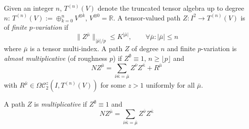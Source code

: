 \documentclass[a4paper,12pt,reqno]{amsproc}
\newcommand{\RR}{\mathbb{R}}
\newcommand{\NN}{N}
\newcommand{\OCC}{\Omega \mathcal{C}}
\begin{document}
Given an integer $n$, $T^{(n)}(V)$ denote the truncated tensor algebra
up to degree $n$:   $T^{(n)}(V) := \oplus_{k=0}^n V^{\otimes k}$,
$V^{\otimes 0 } = \RR$. A tensor-valued path $Z : I^2
\to T^{(n)}(V)$ is of \emph{finite $p$-variation} if 
\begin{equation}
  \label{eq:finite_p_variation_path}
 \|Z^{\bar{\mu}}\|_{|\bar{\mu}|/p} \le K^{|\bar\mu|}, \qquad \forall
 \bar{\mu} : | \bar{\mu}| \le n  
\end{equation}
where $\bar{\mu}$ is a tensor multi-index. A path $Z$ of degree $n$
and finite $p$-variation is \emph{almost multiplicative} (of roughness $p$) if
$Z^\emptyset \equiv 1$, $n \ge \lfloor p \rfloor$ and
\begin{equation}
  \label{eq:almost_multiplicative}
  \NN Z^{\bar\mu} =  
\sum_{\bar\nu\bar\kappa =  \bar\mu}
  Z^{\bar\nu} Z^{\bar\kappa} + R^{\bar\mu}
\end{equation}
with $R^{\bar\mu} \in \OCC_2^z(I,T^{(n)}(V))$ for some $z>1$ uniformly for all $\bar\mu$.

A path $Z$ is \emph{multiplicative} if
$Z^\emptyset \equiv 1$ and
\begin{equation}
  \label{eq:multiplicative}
  \NN Z^{\bar\mu} =  
\sum_{\bar\nu\bar\kappa =  \bar\mu}  Z^{\bar\nu} Z^{\bar\kappa} 
\end{equation}
\end{document}

